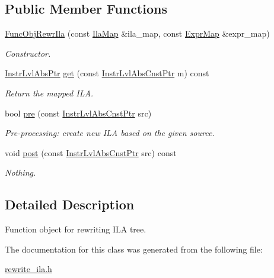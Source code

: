 \subsection*{Public Member Functions}
\begin{DoxyCompactItemize}
\item 
\mbox{\label{classilang_1_1_func_obj_rewr_ila_af91214bdb55438829370cee610021919}} 
\mbox{\hyperlink{classilang_1_1_func_obj_rewr_ila_af91214bdb55438829370cee610021919}{Func\+Obj\+Rewr\+Ila}} (const \mbox{\hyperlink{classilang_1_1_func_obj_rewr_ila_acaa3c9d9277c11b7d0adae053dc86757}{Ila\+Map}} \&ila\+\_\+map, const \mbox{\hyperlink{namespaceilang_ad40e6475e04844bcad9c380aac0b215c}{Expr\+Map}} \&expr\+\_\+map)
\begin{DoxyCompactList}\small\item\em Constructor. \end{DoxyCompactList}\item 
\mbox{\label{classilang_1_1_func_obj_rewr_ila_a5fe162050229baa3446b377b6c55e7bb}} 
\mbox{\hyperlink{namespaceilang_ad1b30fdf347e493b3937143da05d1a72}{Instr\+Lvl\+Abs\+Ptr}} \mbox{\hyperlink{classilang_1_1_func_obj_rewr_ila_a5fe162050229baa3446b377b6c55e7bb}{get}} (const \mbox{\hyperlink{namespaceilang_adc86156b73aa1a4b6369645e9b96ff19}{Instr\+Lvl\+Abs\+Cnst\+Ptr}} m) const
\begin{DoxyCompactList}\small\item\em Return the mapped I\+LA. \end{DoxyCompactList}\item 
\mbox{\label{classilang_1_1_func_obj_rewr_ila_a61a436da0720f881f97a7f087d9904bd}} 
bool \mbox{\hyperlink{classilang_1_1_func_obj_rewr_ila_a61a436da0720f881f97a7f087d9904bd}{pre}} (const \mbox{\hyperlink{namespaceilang_adc86156b73aa1a4b6369645e9b96ff19}{Instr\+Lvl\+Abs\+Cnst\+Ptr}} src)
\begin{DoxyCompactList}\small\item\em Pre-\/processing\+: create new I\+LA based on the given source. \end{DoxyCompactList}\item 
\mbox{\label{classilang_1_1_func_obj_rewr_ila_a7d211374362a4f0760a9533c868f7f0c}} 
void \mbox{\hyperlink{classilang_1_1_func_obj_rewr_ila_a7d211374362a4f0760a9533c868f7f0c}{post}} (const \mbox{\hyperlink{namespaceilang_adc86156b73aa1a4b6369645e9b96ff19}{Instr\+Lvl\+Abs\+Cnst\+Ptr}} src) const
\begin{DoxyCompactList}\small\item\em Nothing. \end{DoxyCompactList}\end{DoxyCompactItemize}


\subsection{Detailed Description}
Function object for rewriting I\+LA tree. 

The documentation for this class was generated from the following file\+:\begin{DoxyCompactItemize}
\item 
\mbox{\hyperlink{rewrite__ila_8h}{rewrite\+\_\+ila.\+h}}\end{DoxyCompactItemize}

